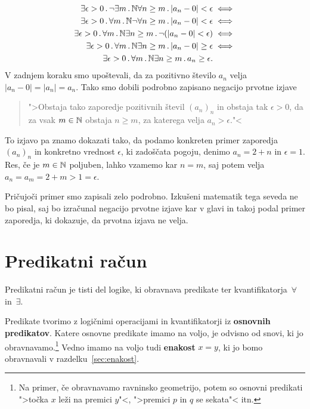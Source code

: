 \begin{primer}
\begin{align*}
    \exists \epsilon > 0 \,.\, \lnot \exists m \,.\,{\mathbb{N}} \forall n \geq m \,.\,
          |a_n - 0| < \epsilon &\iff
    \\
    \exists \epsilon > 0 \,.\, \forall m \,.\,{\mathbb{N}} \lnot \forall n \geq m \,.\,
          |a_n - 0| < \epsilon &\iff
    \\
    \exists \epsilon > 0 \,.\, \forall m \,.\,{\mathbb{N}} \exists n \geq m \,.\,
          \lnot (|a_n - 0| < \epsilon) &\iff
    \\
    \exists \epsilon > 0 \,.\, \forall m \,.\,{\mathbb{N}} \exists n \geq m \,.\,
          |a_n - 0| \geq \epsilon &\iff
    \\
    \exists \epsilon > 0 \,.\, \forall m \,.\,{\mathbb{N}} \exists n \geq m \,.\,
          a_n \geq \epsilon.
  \end{align*}
  V zadnjem koraku smo upoštevali, da za pozitivno število $a_n$ velja
  $|a_n - 0| = |a_n| = a_n$. Tako smo dobili podrobno zapisano
  negacijo prvotne izjave
  \begin{quote}
    ">Obstaja tako zaporedje pozitivnih števil $(a_n)_n$ in obstaja
    tak $\epsilon > 0$, da za vsak $m \in \mathbb{N}$ obstaja $n \geq m$, za
    katerega velja $a_n > \epsilon$."<
  \end{quote}
  To izjavo pa znamo dokazati tako, da podamo konkreten primer
  zaporedja $(a_n)_n$ in konkretno vrednost $\epsilon$, ki zadoščata
  pogoju, denimo $a_n = 2 + n$ in $\epsilon = 1$. Res, če je $m \in
  \mathbb{N}$ poljuben, lahko vzamemo kar $n = m$, saj potem velja $a_n = a_m
  = 2 + m > 1 = \epsilon$.

  Pričujoči primer smo zapisali zelo podrobno. Izkušeni matematik tega
  seveda ne bo pisal, saj bo izračunal negacijo prvotne izjave kar v
  glavi in takoj podal primer zaporedja, ki dokazuje, da prvotna
  izjava ne velja.
\end{primer}

\section{Predikatni račun}
\label{sec:predikatni-racun}

Predikatni račun je tisti del logike, ki obravnava predikate ter
kvantifikatorja~$\forall$ in~$\exists$.

Predikate tvorimo z logičnimi operacijami in kvantifikatorji iz
\textbf{osnovnih predikatov}. Katere osnovne predikate imamo na voljo,
je odvisno od snovi, ki jo obravnavamo.\footnote{Na primer, če
  obravnavamo ravninsko geometrijo, potem so osnovni predikati ">točka
  $x$ leži na premici $y$"<, ">premici $p$ in $q$ se sekata"< itn.}
Vedno imamo na voljo tudi \textbf{enakost} $x = y$, ki jo bomo
obravnavali v razdelku~\ref{sec:enakost}.

